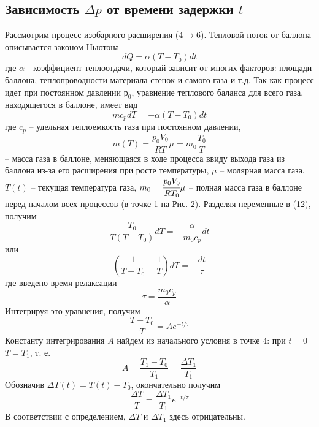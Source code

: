 \documentclass[a4paper,12pt]{article}
\theoremstyle{plain} %
\theoremstyle{definition} %
\theoremstyle{remark} %
\begin{document}
\subsection{Зависимость $\Delta p$ от времени задержки $t$}
Рассмотрим процесс изобарного расширения ($4\rightarrow6$). Тепловой поток от баллона описывается законом Ньютона
\[dQ = \alpha (T-T_0)dt\]
где $\alpha$ - коэффициент теплоотдачи, который зависит от многих факторов: площади баллона, теплопроводности материала стенок и самого газа и т.д. Так как процесс идет при постоянном давлении $р_0$, уравнение теплового баланса для всего газа, находящегося в баллоне, имеет вид
\begin{equation}
mc_pdT = -\alpha (T-T_0)dt
\end{equation}
где $c_p$ -- удельная теплоемкость газа при постоянном давлении,
\[m(T) = \frac{p_0V_0}{RT}\mu = m_0\frac{T_0}{T}\]
-- масса газа в баллоне, меняющаяся в ходе процесса ввиду выхода газа из баллона из-за его расширения при росте температуры, $\mu$ -- молярная масса газа. \\
$T(t)$ -- текущая температура газа, $m_0 = \cfrac{p_0V_0}{RT_0}\mu$ -- полная масса газа в баллоне перед началом всех процессов (в точке 1 на Рис. 2). Разделяя переменные в (12), получим
\[\frac{T_0}{T(T-T_0)}dT = -\frac{\alpha}{m_0c_p}dt\]
или
\[\left(\frac{1}{T-T_0} - \frac{1}{T}\right)dT = -\frac{dt}{\tau}\]
где введено время релаксации
\[\tau = \frac{m_0c_p}{\alpha}\]
Интегрируя это уравнения, получим
\begin{equation}
	\frac{T-T_0}{T} = Ae^{-t/\tau}
\end{equation}
Константу интегрирования $A$ найдем из начального условия в точке $4$: при $t=0$ $T = T_1$, т. е.
\[A = \frac{T_1-T_0}{T_1} = \frac{\Delta T_1}{T_1}\]
Обозначив $\Delta T(t) = T(t) - T_0$, окончательно получим
\begin{equation}
\frac{\Delta T}{T} = \frac{\Delta T_1}{T_1}e^{-t/\tau}
\end{equation}
В соответствии с определением, $\Delta T$ и $\Delta T_1$ здесь отрицательны.
\end{document}
